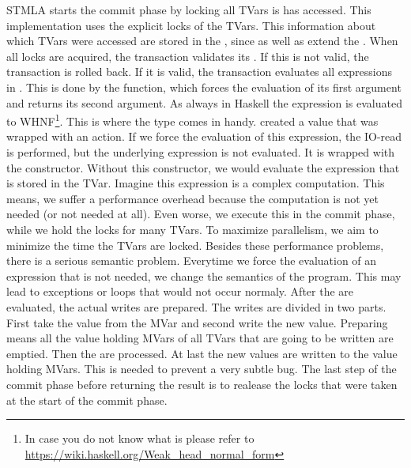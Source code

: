 STMLA starts the commit phase by locking all TVars is has accessed. This implementation 
uses the explicit locks of the TVars. This information about which TVars were accessed are 
stored in the , since  as well as  extend 
the .
When all locks are acquired, the transaction validates its .
If this is not valid, the transaction is rolled back.
If it is valid, the transaction evaluates all expressions in . This is done
by the  function, which forces the evaluation of its first argument and returns 
its second argument. As always in Haskell the expression is evaluated to WHNF\footnote{In 
case you do not know what  is please refer to 
\url{https://wiki.haskell.org/Weak_head_normal_form}}. This is where the  type 
comes in handy.  created a  value that was wrapped with an
 action. If we force the evaluation of this expression, the 
IO-read is performed, but the underlying expression is not evaluated. It is wrapped 
with the  constructor. Without this constructor, we would evaluate the expression that 
is stored in the TVar. Imagine this expression is a complex computation. This means, we 
suffer a performance overhead because the computation is not yet needed (or not needed at all). 
Even worse, we execute this in the commit phase, while we hold the locks for many TVars.
To maximize parallelism, we aim to minimize the time the TVars are locked. Besides these
performance problems, there is a serious semantic problem. Everytime we force the 
evaluation of an expression that is not needed, we change the semantics of the program.
This may lead to exceptions or loops that would not occur normaly.
After the  are evaluated, the actual writes are prepared. The writes are 
divided in two parts. First take the value from the MVar and second write the new value.
Preparing means all the value holding MVars of all TVars that are going to be written
are emptied. Then the  are processed. At last the new values are written
to the value holding MVars. This is needed to prevent a very subtle bug. 
The last step of the commit phase before returning the result is to realease the locks
that were taken at the start of the commit phase.

